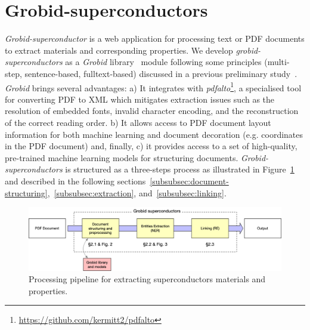 \documentclass[]{interact}
\theoremstyle{plain}%
\theoremstyle{definition}
\theoremstyle{remark}
\begin{document}
\section{Grobid-superconductors}

\textit{Grobid-superconductor} is a web application for processing text or PDF documents to extract materials and corresponding properties.
We develop \textit{grobid-superconductors} as a \textit{Grobid} library~\cite{GROBID} module following some principles (multi-step, sentence-based, fulltext-based) discussed in a previous preliminary study~\cite{foppiano:hal-02870896}.
\textit{Grobid} brings several advantages: a) It integrates with \textit{pdfalto}\footnote{\url{https://github.com/kermitt2/pdfalto}}, a specialised tool for converting PDF to XML which mitigates extraction issues such as the resolution of embedded fonts, invalid character encoding, and the reconstruction of the correct reading order.
b) It allows access to PDF document layout information for both machine learning and document decoration (e.g. coordinates in the PDF document) and, finally, c) it provides access to a set of high-quality, pre-trained machine learning models for structuring documents.
\textit{Grobid-superconductors} is structured as a three-steps process as illustrated in Figure~\ref{fig:pipeline-overview} and described in the following sections~\ref{subsubsec:document-structuring},~\ref{subsubsec:extraction}, and~\ref{subsubsec:linking}.

\begin{figure}[ht]
    \includegraphics[width=\textwidth]{schema-architecture-colors}
    \caption{Processing pipeline for extracting superconductors materials and properties. }
    \label{fig:pipeline-overview}
\end{figure}
\end{document}
